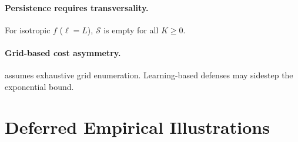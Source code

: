\documentclass[11pt]{article}
\begin{document}
\paragraph{Persistence requires transversality.}
For isotropic $f$ ($\ell = L$), $\mathcal{S}$ is empty for all $K \geq 0$.

\paragraph{Grid-based cost asymmetry.}
 assumes exhaustive grid enumeration. Learning-based
defenses may sidestep the exponential bound.

\section{Deferred Empirical Illustrations}
\label{app:deferred-empirical}

\begin{table}[h]
\centering
\small
\caption{Continuous-defense validator across three OpenAI target
models. $\mathrm{FP}_{\mathrm{int}} = 0$ holds across all three.}
\label{tab:three-target}

\end{table}

\begin{table}[h]
\centering
\small
\caption{Llama-Guard-3-1B applied to the $82$
unsafe-seed prompts, demonstrating
's injective-incomplete horn. 52 of 82 attacks pass as \texttt{safe}.}
\label{tab:llamaguard-demo}

\end{table}

\begin{table}[h]
\centering
\small
\caption{Forced-collapse demonstration of~
on $66$ unsafe prompts.
Complete defenses collapse $66$ inputs to $1$ or $7$ outputs; the injective paraphrase defense keeps all $66$ distinct.}
\label{tab:forced-collapse}

\end{table}

\begin{table}[h]
\centering
\small
\caption{Paraphrase defense is injective ($66$ distinct outputs), so 
requires incompleteness. Rescoring confirms $1/66$ remains above $\tau$.}
\label{tab:paraphrase-unsafe}

\end{table}

\begin{table}[h]
\centering
\small
\caption{Per-turn boundary-fixation statistics. Running-max AD is monotone non-decreasing.}
\label{tab:multi-turn}

\end{table}
\end{document}
